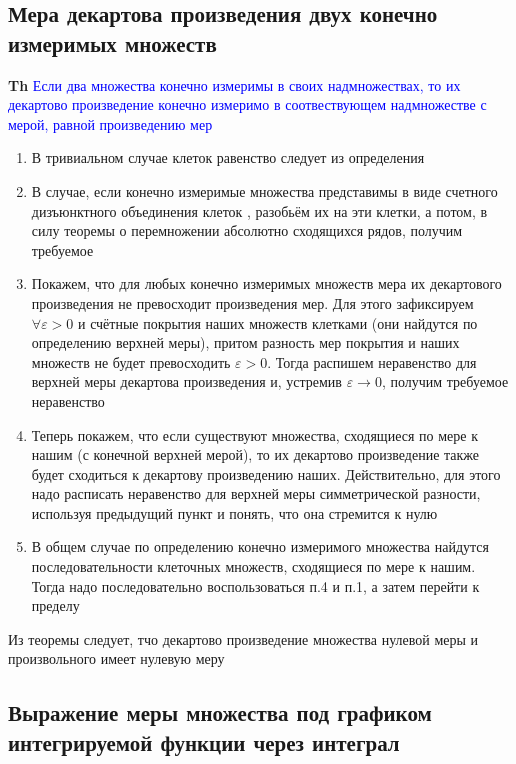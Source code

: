\subsection{Мера декартова произведения двух конечно измеримых множеств}

\textbf{Th} \textcolor{blue}{Если два множества конечно измеримы в своих надмножествах, то их декартово
произведение конечно измеримо в соотвествующем надмножестве с мерой, равной произведению мер}

\begin{enumerate}
    \item В тривиальном случае клеток равенство следует из определения
    \item В случае, если конечно измеримые множества представимы в виде счетного дизъюнктного объединения клеток
    , разобьём их на эти клетки, а потом, в силу теоремы о перемножении абсолютно сходящихся рядов, получим
    требуемое
    \item Покажем, что для любых конечно измеримых множеств мера их декартового произведения не превосходит
    произведения мер.
    Для этого зафиксируем $\forall \varepsilon > 0$ и счётные покрытия наших множеств клетками (они найдутся по
    определению верхней меры), притом разность мер покрытия и наших множеств не будет
    превосходить $\varepsilon > 0$.
    Тогда распишем неравенство для верхней меры декартова произведения и, устремив $\varepsilon \rightarrow 0$,
    получим требуемое неравенство
    \item Теперь покажем, что если существуют множества, сходящиеся по мере к нашим (с конечной верхней мерой), то
    их декартово произведение также будет сходиться к декартову произведению наших.
    Действительно, для этого надо расписать неравенство для верхней меры симметрической разности, используя
    предыдущий пункт и понять, что она стремится к нулю
    \item В общем случае по определению конечно измеримого множества найдутся последовательности клеточных
    множеств, сходящиеся по мере к нашим.
    Тогда надо последовательно воспользоваться п.4 и п.1, а затем перейти к пределу
\end{enumerate}

Из теоремы следует, тчо декартово произведение множества нулевой меры и произвольного имеет нулевую меру

 \subsection{Выражение меры множества под графиком интегрируемой функции через интеграл}

